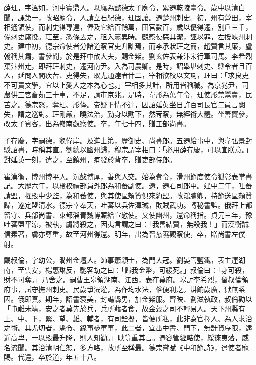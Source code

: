 \begin{pinyinscope}
 薛玨，字溫如，河中寶鼎人。以廕為懿德太子廟令，累遷乾陵臺令。歲中以清白聞，課第一，改昭應令，人請立石紀德，玨固讓。遷楚州刺史。初，州有營田，宰相遙領使，而刺史得專達，俸及它給百餘萬，田官數百，歲以優得遷，別戶三千，備刺史廝役。玨至，悉條去之，租入贏異時。觀察使惡其潔，誣以罪，左授峽州刺史。建中初，德宗命使者分諸道察官吏升黜焉，而李承狀玨之簡，趙贊言其廉，盧翰稱其肅，書參聞，於是拜中散大夫，賜金紫。劉玄佐表兼汴宋行軍司馬。李希烈棄汴州走，即拜玨刺史，遷河南尹。入為司農卿。是時，詔舉堪刺史、縣令者且百人，延問人間疾苦、吏得失，取尤通達者什二，宰相欲校以文詞，玨曰：「求良吏不可責文學，宜以上愛人之本為心也。」宰相多其計，所用皆稱職。為京兆尹，司農供三宮畜茹三十車，不足，請市京兆。是時，韋彤為萬年令，玨使彤禁鬻賣，民苦之。德宗怒，奪玨、彤俸。帝疑下情不達，因詔延英坐日許百司長官二員言闕失，謂之巡對。玨剛嚴，曉法治，勤身以勸下，然苛察，無經術大體。坐善竇參，改太子賓客，出為嶺南觀察使。卒，年七十四，贈工部尚書。



 子存慶，字嗣德，貌偉岸。及進士第，歷御史、尚書郎。五遷給事中，與韋弘景封駁詔書，時稱其直。劉總以幽州歸，穆宗謂宰相曰：「必用薛存慶，可以宣朕意。」對延英一刻，遣之，至鎮州，疽發於背卒，贈吏部侍郎。



 崔漢衡，博州博平人。沉懿博厚，善與人交。始為費令，滑州節度使令狐彰表掌書記。大歷六年，以檢校禮部員外郎為和蕃副使。還，遷右司郎中。建中二年，吐蕃請盟，擢殿中少監，為和蕃使，與其使區頰贊俱來約盟。改鴻臚卿，持節送區頰贊歸，遂定盟清水。德宗幸奉天，吐蕃以兵佐渾瑊，敗賊武功。轉秘書監。俄拜上都留守、兵部尚書、東都淄青魏博賑給宣慰使。又使幽州，還命稱指。貞元三年，豫吐蕃盟平涼，被執，虜將殺之，因夷言謂之曰：「我善結贊，無殺我！」而漢衡誠信素著，虜亦尊重，故至河州得還。明年，出為晉慈隰觀察使，卒，贈尚書左僕射。



 戴叔倫，字幼公，潤州金壇人。師事蕭穎士，為門人冠。劉晏管鹽鐵，表主運湖南，至雲安，楊惠琳反，馳客劫之曰：「歸我金幣，可緩死。」叔倫曰：「身可殺，財不可奪。」乃舍之。嗣曹王皋領湖南、江西，表在幕府。皋討李希烈，留叔倫領府事，試守撫州刺史。民歲爭溉灌，為作均水法，俗便利之。耕餉歲廣，獄無系囚。俄即真。期年，詔書褒美，封譙縣男，加金紫服。齊映、劉滋執政，叔倫勸以「屯難未靖，安之者莫先於兵，兵所藉者食，故金穀之司不輕易人。天下州縣有上、中、下，緊、望、雄、輔者，有司銓擬，皆便所私，此非為官擇人、為人求治之術。其尤切者，縣令、錄事參軍事，此二者，宜出中書、門下，無計資序限，遠近高卑，一以殿最升降，則人知勸。」映等重其言。遷容管經略使，綏徠夷落，威名流聞。其治清明仁恕，多方略，故所至稱最。德宗嘗賦《中和節詩》，遣使者寵賜。代還，卒於道，年五十八。




\end{pinyinscope}
